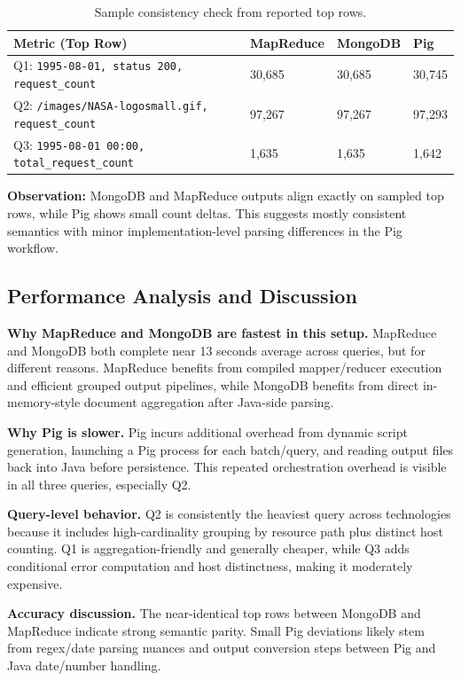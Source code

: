 \documentclass[12pt,a4paper]{article}
\begin{document}
\begin{table}[h!]
\centering
\begin{tabular}{p{} p{} p{} p{}}
\toprule
\textbf{Metric (Top Row)} & \textbf{MapReduce} & \textbf{MongoDB} & \textbf{Pig} \\
\midrule
Q1: \texttt{1995-08-01, status 200, request\_count} & 30,685 & 30,685 & 30,745 \\
Q2: \texttt{/images/NASA-logosmall.gif, request\_count} & 97,267 & 97,267 & 97,293 \\
Q3: \texttt{1995-08-01 00:00, total\_request\_count} & 1,635 & 1,635 & 1,642 \\
\bottomrule
\end{tabular}
\caption{Sample consistency check from reported top rows.}
\end{table}

\textbf{Observation:} MongoDB and MapReduce outputs align exactly on sampled top rows, while Pig shows small count deltas. This suggests mostly consistent semantics with minor implementation-level parsing differences in the Pig workflow.

\subsection{Performance Analysis and Discussion}

\textbf{Why MapReduce and MongoDB are fastest in this setup.}
MapReduce and MongoDB both complete near 13 seconds average across queries, but for different reasons. MapReduce benefits from compiled mapper/reducer execution and efficient grouped output pipelines, while MongoDB benefits from direct in-memory-style document aggregation after Java-side parsing.

\textbf{Why Pig is slower.}
Pig incurs additional overhead from dynamic script generation, launching a Pig process for each batch/query, and reading output files back into Java before persistence. This repeated orchestration overhead is visible in all three queries, especially Q2.

\textbf{Query-level behavior.}
Q2 is consistently the heaviest query across technologies because it includes high-cardinality grouping by resource path plus distinct host counting. Q1 is aggregation-friendly and generally cheaper, while Q3 adds conditional error computation and host distinctness, making it moderately expensive.

\textbf{Accuracy discussion.}
The near-identical top rows between MongoDB and MapReduce indicate strong semantic parity. Small Pig deviations likely stem from regex/date parsing nuances and output conversion steps between Pig and Java date/number handling.
\end{document}
